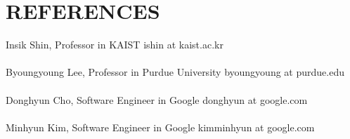 \section{REFERENCES}
   \vspace{0.1in}

    Insik Shin, Professor in KAIST
    \hfill ishin at kaist.ac.kr\\
    \\
%
    Byoungyoung Lee, Professor in Purdue University
    \hfill byoungyoung at purdue.edu\\
    \\
%
    Donghyun Cho, Software Engineer in Google
    \hfill donghyun at google.com\\
    \\
%
    Minhyun Kim, Software Engineer in Google
    \hfill kimminhyun at google.com
